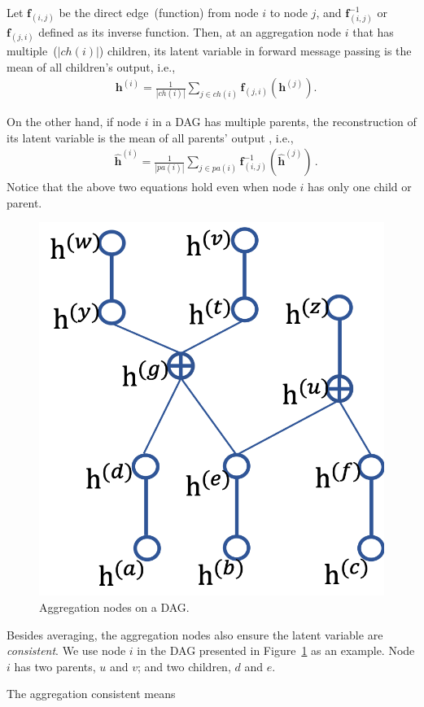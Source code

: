 \documentclass{article}
\begin{document}
Let $\mathbf{f}_{(i, j)}$ be the direct edge~(function) from node $i$ to node $j$, and $\mathbf{f}^{-1}_{ (i, j)}$ or  $\mathbf{f}_{ (j, i)}$ defined as its inverse function. Then, at an aggregation node $i$ that has multiple~($|ch(i)|$) children, its latent variable in forward message passing is the mean of all children's output, i.e.,
 \begin{align*}
&  \mathbf{h}^{(i)} = \frac{1}{|ch(i)|} \sum_{j \in ch(i) } \mathbf{f}_{(j,i)}(\mathbf{h}^{(j)})  .
\end{align*}

On the other hand, if node $i$ in a DAG  has multiple parents, the reconstruction of its latent variable is the mean of all parents' output , i.e.,
 \begin{align*}
 &\widehat{\mathbf{h}}^{(i)} = \frac{1}{|pa(i)|} \sum_{j \in pa(i) } \mathbf{f}^{-1}_{ (i,j)}(\widehat{\mathbf{h}}^{(j)}) \, .
\end{align*}%
Notice that the above two equations hold even when node $i$ has only one child or parent.


\begin{figure}[H]
\begin{center}
 \includegraphics[width=0.3\linewidth]{fig/dag_aggr.png}
\end{center}
\caption{ {\small  Aggregation nodes on a DAG.}}
\label{fig:dag_aggr}
\end{figure}

Besides averaging, the aggregation nodes also ensure the latent variable are \emph{consistent}. We use node $i$ in the DAG presented in Figure~\ref{fig:dag_aggr} as an example. Node $i$ has two parents, $u$ and $v$; and two children, $d$ and $e$. 

The aggregation consistent means 




\end{document}
